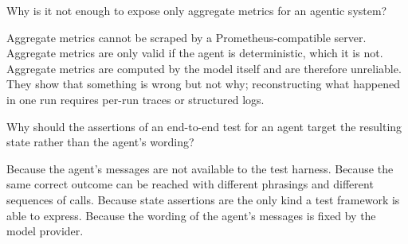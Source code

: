 \begin{questions}
\qitem Why is it not enough to expose only aggregate metrics for an agentic system?
\begin{choices}
  \choice Aggregate metrics cannot be scraped by a Prometheus-compatible server.
  \choice Aggregate metrics are only valid if the agent is deterministic, which it is not.
  \choice Aggregate metrics are computed by the model itself and are therefore unreliable.
  \CorrectChoice They show that something is wrong but not why; reconstructing what happened in one run requires per-run traces or structured logs.
\end{choices}
\dontknow
{}

\qitem Why should the assertions of an end-to-end test for an agent target the resulting state rather
than the agent's wording?
\begin{choices}
  \choice Because the agent's messages are not available to the test harness.
  \CorrectChoice Because the same correct outcome can be reached with different phrasings and different sequences of calls.
  \choice Because state assertions are the only kind a test framework is able to express.
  \choice Because the wording of the agent's messages is fixed by the model provider.
\end{choices}
\dontknow
{}

\end{questions}

